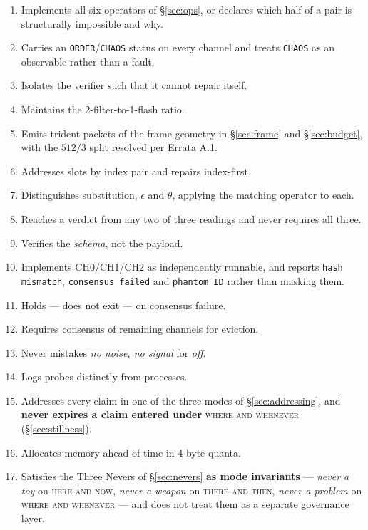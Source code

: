 \documentclass[11pt,a4paper]{article}
\begin{document}
\begin{enumerate}[leftmargin=*,noitemsep]
  \item Implements all six operators of \S\ref{sec:ops}, or declares which half
    of a pair is structurally impossible and why.
  \item Carries an \texttt{ORDER}/\texttt{CHAOS} status on every channel and
    treats \texttt{CHAOS} as an observable rather than a fault.
  \item Isolates the verifier such that it cannot repair itself.
  \item Maintains the 2-filter-to-1-flash ratio.
  \item Emits trident packets of the frame geometry in \S\ref{sec:frame} and
    \S\ref{sec:budget}, with the $512/3$ split resolved per Errata A.1.
  \item Addresses slots by index pair and repairs index-first.
  \item Distinguishes substitution, $\epsilon$ and $\theta$, applying the
    matching operator to each.
  \item Reaches a verdict from any two of three readings and never requires all
    three.
  \item Verifies the \emph{schema}, not the payload.
  \item Implements CH0/CH1/CH2 as independently runnable, and reports
    \texttt{hash mismatch}, \texttt{consensus failed} and
    \texttt{phantom ID} rather than masking them.
  \item Holds --- does not exit --- on consensus failure.
  \item Requires consensus of remaining channels for eviction.
  \item Never mistakes \emph{no noise, no signal} for \emph{off}.
  \item Logs probes distinctly from processes.
  \item Addresses every claim in one of the three modes of
    \S\ref{sec:addressing}, and \textbf{never expires a claim entered under}
    \textsc{where and whenever} (\S\ref{sec:stillness}).
  \item Allocates memory ahead of time in 4-byte quanta.
  \item Satisfies the Three Nevers of \S\ref{sec:nevers} \textbf{as mode
    invariants} --- \emph{never a toy} on \textsc{here and now}, \emph{never a
    weapon} on \textsc{there and then}, \emph{never a problem} on \textsc{where
    and whenever} --- and does not treat them as a separate governance layer.
\end{enumerate}
\end{document}
